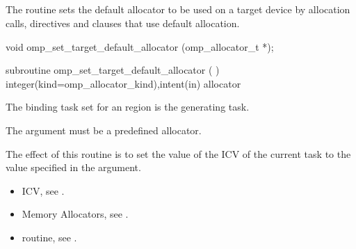 \ccppspecificstart

\subsection{}
\label{subsec:omp_set_target_default_allocator}

\summary
The  routine sets the default allocator to be used on a target device by allocation calls, directives and clauses that use default allocation.

\format
\ccppspecificstart
\begin{boxedcode}
void omp_set_target_default_allocator (omp_allocator_t *);
\end{boxedcode}
\ccppspecificend
\fortranspecificstart
\begin{boxedcode}
subroutine omp_set_target_default_allocator (  )
integer(kind=omp_allocator_kind),intent(in) allocator
\end{boxedcode}
\fortranspecificend
\binding
The binding task set for an  region is the generating task.

\constraints

The  argument must be a predefined allocator.

\effect

The effect of this routine is to set the value of the  ICV of the current task to the value specified in the  argument. 

\crossreferences

\begin{itemize}
\item {} ICV, see .
\item Memory Allocators, see .
\item {} routine, see .
\end{itemize}

\subsection{}
\label{subsec:omp_get_target_default_allocator}

